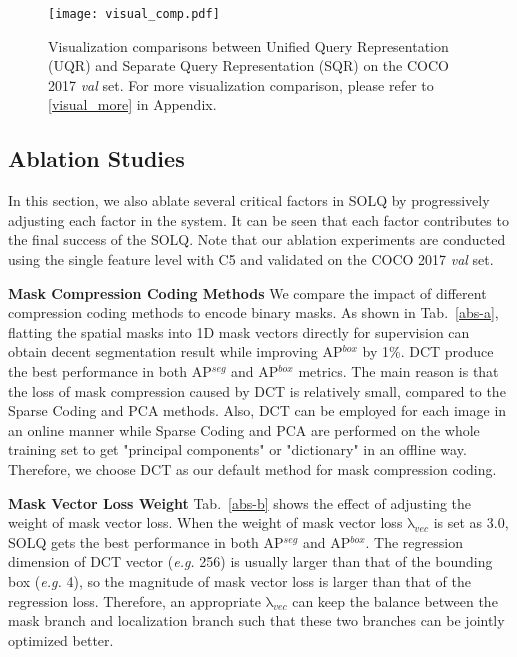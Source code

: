 \documentclass{article}
\begin{document}
\begin{figure}[th]
\centering
\texttt{[image: visual\_comp.pdf]}
\caption{
Visualization comparisons between Unified Query Representation (UQR) and Separate Query Representation (SQR) on the COCO 2017 \textit{val} set. For more visualization comparison, please refer to \ref{visual_more} in Appendix. 
}
\label{fig:visual}
\end{figure}



\subsection{Ablation Studies}
\label{ablation_studies}
In this section, we also ablate several critical factors in SOLQ by progressively adjusting each factor in the system. It can be seen that each factor contributes to the final success of the SOLQ. 
Note that our ablation experiments are conducted using the single feature level with C5 and validated on the COCO 2017 \textit{val} set.

\textbf{Mask Compression Coding Methods}
We compare the impact of different compression coding methods to encode binary masks. As shown in Tab.~\ref{abs-a}, flatting the spatial masks into 1D mask vectors directly for supervision can obtain decent segmentation result while improving AP$^{box}$ by 1\%. DCT produce the best performance in both AP$^{seg}$ and AP$^{box}$ metrics. The main reason is that the loss of mask compression caused by DCT is relatively small, compared to the Sparse Coding and PCA methods. Also, DCT can be employed for each image in an online manner while Sparse Coding and PCA are performed on the whole training set to get "principal components" or "dictionary" in an offline way. Therefore, we choose DCT as our default method for mask compression coding.

\textbf{Mask Vector Loss Weight}
Tab.~\ref{abs-b} shows the effect of adjusting the weight of mask vector loss. When the weight of mask vector loss $\mathrm{\lambda}_{vec}$ is set as 3.0, SOLQ gets the best performance in both AP$^{seg}$ and AP$^{box}$. The regression dimension of DCT vector (\textit{e.g.} 256) is usually larger than that of the bounding box (\textit{e.g.} 4), so the magnitude of mask vector loss is larger than that of the regression loss. Therefore, an appropriate $\mathrm{\lambda}_{vec}$ can keep the balance between the mask branch and localization branch such that these two branches can be jointly optimized better.
\end{document}
